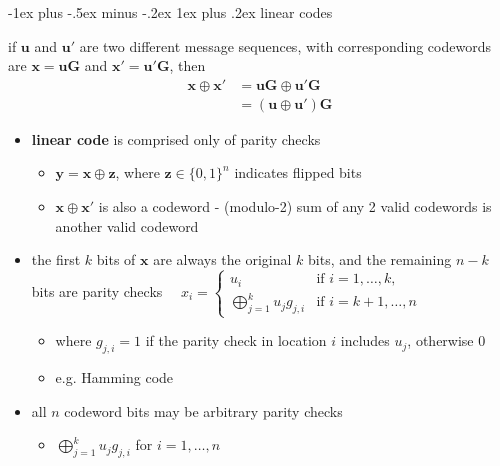 \documentclass[10pt, landscape]{article}
\makeatletter
\renewcommand{\subsubsection}{\@startsection{subsubsection}{3}{0mm}%
  {-1ex plus -.5ex minus -.2ex}%
  {1ex plus .2ex}%
{\normalfont\small\bfseries}}%
\makeatother
\begin{document}
\begin{multicols*}{4}
  \subsubsection{linear codes}

  \begin{tightcenter}
    if $\mathbf{u}$ and $\mathbf{u}'$ are two different message sequences, with corresponding codewords are $\mathbf{x} = \mathbf{uG}$ and $\mathbf{x}' = \mathbf{u}'\mathbf{G}$, then
    \begin{align*}
      \mathbf{x} \oplus \mathbf{x}' &= \mathbf{uG} \oplus \mathbf{u}'\mathbf{G}
                                 \\ &= (\mathbf{u} \oplus \mathbf{u}') \mathbf{G}
    \end{align*}
  \end{tightcenter}

  \begin{itemize}
    \item \textbf{linear code} is comprised only of parity checks
      \begin{itemize}
        \item $\mathbf{y} = \mathbf{x} \oplus \mathbf{z}$, where $\mathbf{z} \in \{0, 1\}^n$ indicates flipped bits
        \item $\mathbf{x} \oplus \mathbf{x}'$ is also a codeword - (modulo-2) sum of any 2 valid codewords is another valid codeword
      \end{itemize}
    \item {} the first $k$ bits of $\mathbf{x}$ are always the original $k$ bits, and the remaining $n-k$ bits are parity checks
      $\quad x_i = \begin{cases} u_i &\text{if } i=1,\dots, k, \\ \bigoplus^k_{j=1} u_jg_{j,i} &\text{if } i = k+1,\dots, n \end{cases}$
      \begin{itemize}
        \item where $g_{j,i} = 1$ if the parity check in location $i$ includes $u_j$, otherwise 0
        \item e.g. Hamming code
      \end{itemize}
    \item {} all $n$ codeword bits may be arbitrary parity checks
      \begin{itemize}
        \item $\bigoplus^k_{j=1} u_jg_{j,i}$ for  $i = 1, \dots, n$
      \end{itemize}
  \end{itemize}


\end{multicols*}
\end{document}
